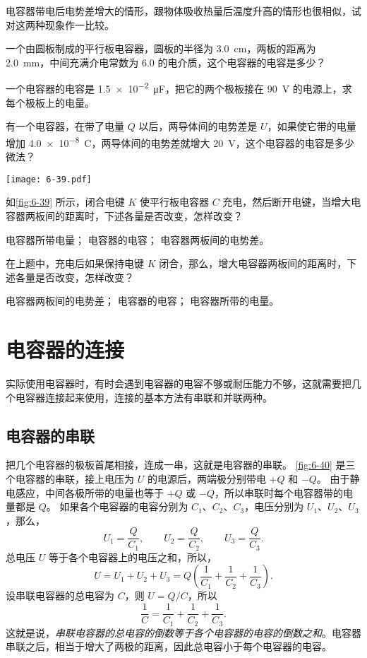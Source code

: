 \begin{Practice}
\begin{question}
	\item 电容器带电后电势差增大的情形，跟物体吸收热量后温度升高的情形也很相似，试对这两种现象作一比较。
	\item 一个由圆板制成的平行板电容器，圆板的半径为 \qty{3.0}{cm}，两板的距离为 \qty{2.0}{mm}，中间充满介电常数为 6.0 的电介质，这个电容器的电容是多少？
	\item 一个电容器的电容是 \qty{1.5e-2}{\micro F}，把它的两个极板接在 \qty{90}{V} 的电源上，求每个极板上的电量。
	\item 有一个电容器，在带了电量 $Q$ 以后，两导体间的电势差是 $U$，如果使它带的电量增加 \qty{4.0e-8}{C}，两导体间的电势差就增大 \qty{20}{V}，这个电容器的电容是多少微法？
	\begin{figurehere}
		\begin{minipage}{\linewidth}\centering
			\texttt{[image: 6-39.pdf]}
			\caption{}\label{fig:6-39}
		\end{minipage}
	\end{figurehere}
	\item 如\cref{fig:6-39} 所示，闭合电键 $K$ 使平行板电容器 $C$ 充电，然后断开电键，当增大电容器两板间的距离时，下述各量是否改变，怎样改变？
	\begin{tasks}
		\task 电容器所带电量；
		\task 电容器的电容；
		\task 电容器两板间的电势差。
	\end{tasks}
	\item 在上题中，充电后如果保持电键 $K$ 闭合，那么，增大电容器两板间的距离时，下述各量是否改变，怎样改变？
	\begin{tasks}
		\task 电容器两板间的电势差；
		\task 电容器的电容；
		\task 电容器所带的电量。
	\end{tasks}
	\end{question}
\end{Practice}

\section{电容器的连接}
实际使用电容器时，有时会遇到电容器的电容不够或耐压能力不够，这就需要把几个电容器连接起来使用，连接的基本方法有串联和并联两种。

\subsection{电容器的串联}
把几个电容器的极板首尾相接，连成一串，这就是电容器的串联。
\cref{fig:6-40} 是三个电容器的串联，接上电压为 $U$ 的电源后，两端极分别带电 $+Q$ 和 $-Q$。
由于静电感应，中间各极所带的电量也等于 $+Q$ 或 $-Q$，所以串联时每个电容器带的电量都是 $Q$。
如果各个电容器的电容分别为 $C_1$、$C_2$、$C_3$，电压分别为 $U_1$、$U_2$、$U_3$，那么，
\[ U_1=\frac{Q}{C_1},\qquad U_2=\frac{Q}{C_2},\qquad U_3=\frac{Q}{C_3}.\]
总电压 $U$ 等于各个电容器上的电压之和，所以，
\[U=U_1+U_2+U_3=Q\left(\frac{1}{C_1}+\frac{1}{C_2}+\frac{1}{C_3}\right).\]
设串联电容器的总电容为 $C$，则 $U=Q/C$，所以
\[\frac{1}{C}=\frac{1}{C_1}+\frac{1}{C_2}+\frac{1}{C_3}.\]
这就是说，\emph{串联电容器的总电容的倒数等于各个电容器的电容的倒数之和}。电容器串联之后，相当于增大了两极的距离，因此总电容小于每个电容器的电容。

